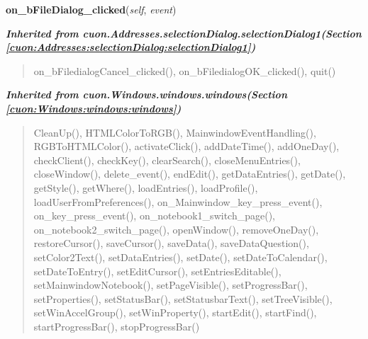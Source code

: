     \label{cuon:Finances:CashAccountBook:standard_cab_monthly:standard_cab_monthly:on_bFileDialog_clicked}

    \vspace{0.5ex}

\hspace{.8\funcindent}\begin{boxedminipage}{\funcwidth}

    \raggedright \textbf{on\_bFileDialog\_clicked}(\textit{self}, \textit{event})

\setlength{\parskip}{2ex}
\setlength{\parskip}{1ex}
    \end{boxedminipage}


\large{\textbf{\textit{Inherited from cuon.Addresses.selectionDialog.selectionDialog1\textit{(Section \ref{cuon:Addresses:selectionDialog:selectionDialog1})}}}}

\begin{quote}
on\_bFiledialogCancel\_clicked(), on\_bFiledialogOK\_clicked(), quit()
\end{quote}

\large{\textbf{\textit{Inherited from cuon.Windows.windows.windows\textit{(Section \ref{cuon:Windows:windows:windows})}}}}

\begin{quote}
CleanUp(), HTMLColorToRGB(), MainwindowEventHandling(), RGBToHTMLColor(), activateClick(), addDateTime(), addOneDay(), checkClient(), checkKey(), clearSearch(), closeMenuEntries(), closeWindow(), delete\_event(), endEdit(), getDataEntries(), getDate(), getStyle(), getWhere(), loadEntries(), loadProfile(), loadUserFromPreferences(), on\_Mainwindow\_key\_press\_event(), on\_key\_press\_event(), on\_notebook1\_switch\_page(), on\_notebook2\_switch\_page(), openWindow(), removeOneDay(), restoreCursor(), saveCursor(), saveData(), saveDataQuestion(), setColor2Text(), setDataEntries(), setDate(), setDateToCalendar(), setDateToEntry(), setEditCursor(), setEntriesEditable(), setMainwindowNotebook(), setPageVisible(), setProgressBar(), setProperties(), setStatusBar(), setStatusbarText(), setTreeVisible(), setWinAccelGroup(), setWinProperty(), startEdit(), startFind(), startProgressBar(), stopProgressBar()
\end{quote}

